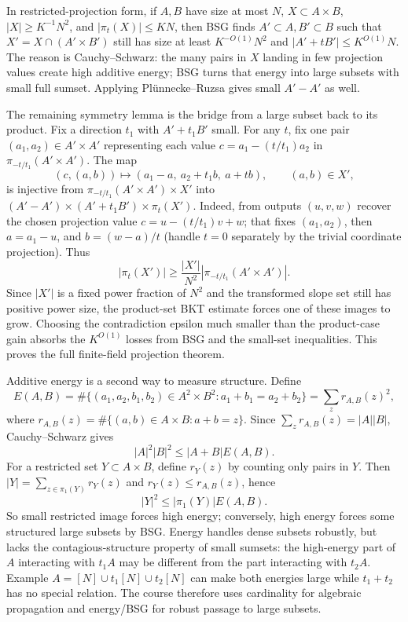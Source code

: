 In restricted-projection form, if \(A,B\) have size at most \(N\), \(X\subset A\times B\), \(|X|\ge K^{-1}N^2\), and \(|\pi_t(X)|\le KN\), then BSG finds \(A'\subset A,B'\subset B\) such that \(X'=X\cap(A'\times B')\) still has size at least \(K^{-O(1)}N^2\) and \(|A'+tB'|\le K^{O(1)}N\). The reason is Cauchy--Schwarz: the many pairs in \(X\) landing in few projection values create high additive energy; BSG turns that energy into large subsets with small full sumset. Applying Plünnecke--Ruzsa gives small \(A'-A'\) as well.

The remaining symmetry lemma is the bridge from a large subset back to its product. Fix a direction \(t_1\) with \(A'+t_1B'\) small. For any \(t\), fix one pair \((a_1,a_2)\in A'\times A'\) representing each value \(c=a_1-(t/t_1)a_2\) in \(\pi_{-t/t_1}(A'\times A')\). The map \[
(c,(a,b))\mapsto(a_1-a,\ a_2+t_1b,\ a+tb),\qquad (a,b)\in X',
\] is injective from \(\pi_{-t/t_1}(A'\times A')\times X'\) into \((A'-A')\times(A'+t_1B')\times\pi_t(X')\). Indeed, from outputs \((u,v,w)\) recover the chosen projection value \(c=u-(t/t_1)v+w\); that fixes \((a_1,a_2)\), then \(a=a_1-u\), and \(b=(w-a)/t\) (handle \(t=0\) separately by the trivial coordinate projection). Thus \[
|\pi_t(X')|\ge \frac{|X'|}{N^2}|\pi_{-t/t_1}(A'\times A')|.
\] Since \(|X'|\) is a fixed power fraction of \(N^2\) and the transformed slope set still has positive power size, the product-set BKT estimate forces one of these images to grow. Choosing the contradiction epsilon much smaller than the product-case gain absorbs the \(K^{O(1)}\) losses from BSG and the small-set inequalities. This proves the full finite-field projection theorem.

Additive energy is a second way to measure structure. Define \[
E(A,B)=\#\{(a_1,a_2,b_1,b_2)\in A^2\times B^2:a_1+b_1=a_2+b_2\}
=\sum_z r_{A,B}(z)^2,
\] where \(r_{A,B}(z)=\#\{(a,b)\in A\times B:a+b=z\}\). Since \(\sum_zr_{A,B}(z)=|A||B|\), Cauchy--Schwarz gives \[
|A|^2|B|^2\le |A+B|E(A,B).
\] For a restricted set \(Y\subset A\times B\), define \(r_Y(z)\) by counting only pairs in \(Y\). Then \(|Y|=\sum_{z\in\pi_1(Y)}r_Y(z)\) and \(r_Y(z)\le r_{A,B}(z)\), hence \[
|Y|^2\le |\pi_1(Y)|E(A,B).
\] So small restricted image forces high energy; conversely, high energy forces some structured large subsets by BSG. Energy handles dense subsets robustly, but lacks the contagious-structure property of small sumsets: the high-energy part of \(A\) interacting with \(t_1A\) may be different from the part interacting with \(t_2A\). Example \(A=[N]\cup t_1[N]\cup t_2[N]\) can make both energies large while \(t_1+t_2\) has no special relation. The course therefore uses cardinality for algebraic propagation and energy/BSG for robust passage to large subsets.

